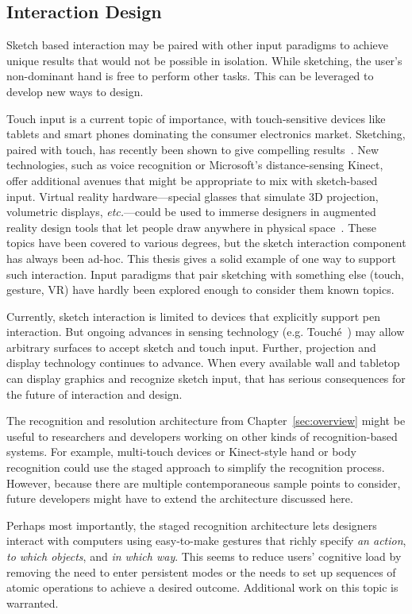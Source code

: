 \subsection{Interaction Design}

Sketch based interaction may be paired with other input paradigms to
achieve unique results that would not be possible in isolation. While
sketching, the user's non-dominant hand is free to perform other
tasks. This can be leveraged to develop new ways to design. 

Touch input is a current topic of importance, with touch-sensitive
devices like tablets and smart phones dominating the consumer
electronics market. Sketching, paired with touch, has recently been
shown to give compelling results~\cite{hinckley-pen-touch}. New
technologies, such as voice recognition or Microsoft's
distance-sensing Kinect, offer additional avenues that might be
appropriate to mix with sketch-based input. Virtual reality
hardware---special glasses that simulate 3D projection, volumetric
displays, \textit{etc.}---could be used to immerse designers in
augmented reality design tools that let people draw anywhere in
physical space~\cite{jung-lightpen}. These topics have been covered to
various degrees, but the sketch interaction component has always been
ad-hoc. This thesis gives a solid example of one way to support such
interaction. Input paradigms that pair sketching with something else
(touch, gesture, VR) have hardly been explored enough to consider them
known topics.

Currently, sketch interaction is limited to devices that explicitly
support pen interaction. But ongoing advances in sensing technology
(e.g. Touch\'e~\cite{sato-touche}) may allow arbitrary surfaces to
accept sketch and touch input. Further, projection and display
technology continues to advance. When every available wall and
tabletop can display graphics and recognize sketch input, that has
serious consequences for the future of interaction and design.

The recognition and resolution architecture from
Chapter~\ref{sec:overview} might be useful to researchers and
developers working on other kinds of recognition-based systems. For
example, multi-touch devices or Kinect-style hand or body recognition
could use the staged approach to simplify the recognition
process. However, because there are multiple contemporaneous sample
points to consider, future developers might have to extend the
architecture discussed here.

Perhaps most importantly, the staged recognition architecture lets
designers interact with computers using easy-to-make gestures that
richly specify \textit{an action}, \textit{to which objects}, and
\textit{in which way}. This seems to reduce users' cognitive load by
removing the need to enter persistent modes or the needs to set up
sequences of atomic operations to achieve a desired
outcome. Additional work on this topic is warranted.

